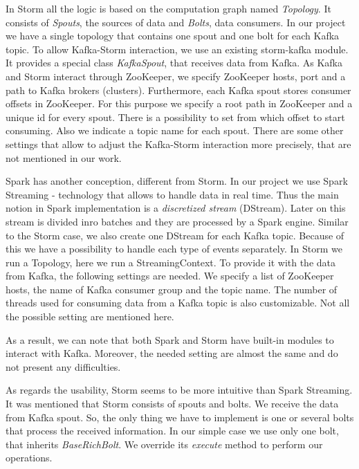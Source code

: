 In Storm all the logic is based on the computation graph named \textit{Topology}.
It consists of \textit{Spouts}, the sources of data and \textit{Bolts}, data consumers.
In our project we have a single topology that contains one spout and one bolt for each Kafka topic.
To allow Kafka-Storm interaction, we use an existing storm-kafka module.
It provides a special class \textit{KafkaSpout}, that receives data from Kafka.
As Kafka and Storm interact through ZooKeeper, we specify ZooKeeper hosts, port and a path to Kafka brokers (clusters).
Furthermore, each Kafka spout stores consumer offsets in ZooKeeper.
For this purpose we specify a root path in ZooKeeper and a unique id for every spout.
There is a possibility to set from which offset to start consuming.
Also we indicate a topic name for each spout.
There are some other settings that allow to adjust the Kafka-Storm interaction more precisely, that are not mentioned in our work.

Spark has another conception, different from Storm.
In our project we use Spark Streaming - technology that allows to handle data in real time.
Thus the main notion in Spark implementation is a \textit{discretized stream} (DStream).
Later on this stream is divided inro batches and they are processed by a Spark engine.
Similar to the Storm case, we also create one DStream for each Kafka topic.
Because of this we have a possibility to handle each type of events separately.
In Storm we run a Topology, here we run a StreamingContext.
To provide it with the data from Kafka, the following settings are needed.
We specify a list of ZooKeeper hosts, the name of Kafka consumer group and the topic name.
The number of threads used for consuming data from a Kafka topic is also customizable.
Not all the possible setting are mentioned here.

As a result, we can note that both Spark and Storm have built-in modules to interact with Kafka.
Moreover, the needed setting are almost the same and do not present any difficulties.


As regards the usability, Storm seems to be more intuitive than Spark Streaming.
It was mentioned that Storm consists of spouts and bolts.
We receive the data from Kafka spout.
So, the only thing we have to implement is one or several bolts that process the received information.
In our simple case we use only one bolt, that inherits \textit{BaseRichBolt}.
We override its \textit{execute} method to perform our operations.


